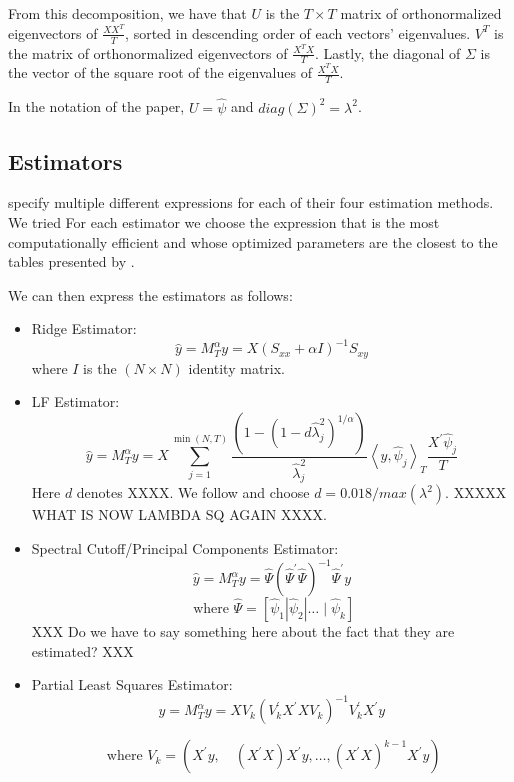 From this decomposition, we have that $U$ is the $T \times T$ matrix of orthonormalized eigenvectors of $\frac{X X^{T}}{T}$, sorted in descending order of each vectors' eigenvalues. $V^{T}$ is the matrix of orthonormalized eigenvectors of $\frac{X^{T} X}{T}$. Lastly, the diagonal of $\Sigma$ is the vector of the square root of the eigenvalues of $\frac{X^{T} X}{T}$.

In the notation of the \citeauthor{carrasco2016sample} paper, $U = \hat{\psi}$ and $diag(\Sigma)^{2} = \lambda^{2}$.

\subsection{Estimators}

\citeauthor{carrasco2016sample} specify multiple different expressions for each of their four estimation methods. We tried For each estimator we choose the expression that is the most computationally efficient and whose optimized parameters are the closest to the tables presented by \citeauthor{carrasco2016sample}.

We can then express the estimators as follows: 

\begin{itemize}
	\item Ridge Estimator: \\
	 \[\widehat{y} = M_{T}^{\alpha} y = X (S_{xx} + \alpha I)^{-1} S_{xy}\]
	 where $I$ is the $(N \times N)$ identity matrix.
	 
	\item LF Estimator: \\
\[\widehat{y} = M_{T}^{\alpha} y = X \sum_{j=1}^{\min (N, T)} \frac{\left(1-\left(1-d \widehat{\lambda}_{j}^{2}\right)^{1 / \alpha}\right)}{\widehat{\lambda}_{j}^{2}}\left\langle y, \hat{\psi}_{j}\right\rangle_{T} \frac{X^{\prime} \hat{\psi}_{j}}{T}\]
Here $d$ denotes XXXX. We follow \citeauthor{carrasco2016sample} and choose $d = 0.018/max(\lambda^2)$. XXXXX WHAT IS NOW LAMBDA SQ AGAIN XXXX.

	\item Spectral Cutoff/Principal Components Estimator: \\
\[\widehat{y} = M_{T}^{\alpha} y = \widehat{\Psi} \left(\widehat{\Psi}^{\prime} \widehat{\Psi}\right)^{-1} \widehat{\Psi}^{\prime} y\]
\[\text{ where } \widehat{\Psi} = \left[\widehat{\psi}_{1}\left|\widehat{\psi}_{2}\right| \ldots \mid \widehat{\psi}_{k}\right]\]
XXX Do we have to say something here about the fact that they are estimated? XXX

	\item Partial Least Squares Estimator: \\

\[\widehat{y} = M_{T}^{\alpha} y = X V_{k}\left(V_{k}^{\prime} X^{\prime} X V_{k}\right)^{-1} V_{k}^{\prime} X^{\prime} y\]

\[\text{ where } V_{k}=\left(X^{\prime} y, \quad\left(X^{\prime} X\right) X^{\prime} y, \ldots,\left(X^{\prime} X\right)^{k-1} X^{\prime} y\right)\]

\end{itemize}

